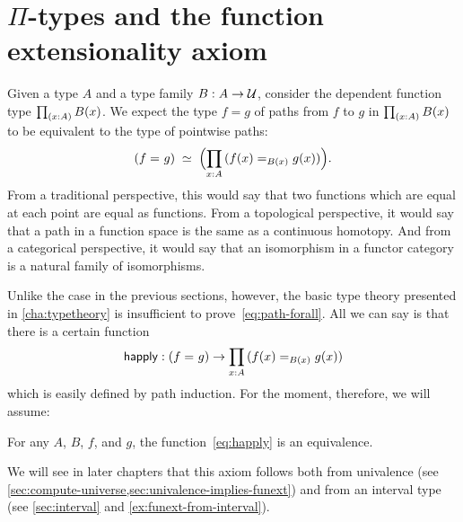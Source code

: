%

\section{\texorpdfstring{$\Pi$}{Π}-types and the function extensionality axiom}
\label{sec:compute-pi}

%
%
%
Given a type $A$ and a type family $B : A \to \mathcal{U}$, consider the dependent function type $\prd{x:A}B(x)$.
We expect the type $f=g$ of paths from $f$ to $g$ in $\prd{x:A} B(x)$ to be equivalent to
the type of pointwise paths:
\begin{equation}
  \eqvspaced{(\id{f}{g})}{\Parens{\prd{x:A} (\id[B(x)]{f(x)}{g(x)})}}.\label{eq:path-forall}
\end{equation}
From a traditional perspective, this would say that two functions which are equal at each point are equal as functions.
%
From a topological perspective, it would say that a path in a function space is the same as a continuous homotopy.
%
And from a categorical perspective, it would say that an isomorphism in a functor category is a natural family of isomorphisms.

Unlike the case in the previous sections, however, the basic type theory presented in \cref{cha:typetheory} is insufficient to prove~\eqref{eq:path-forall}.
All we can say is that there is a certain function
\begin{equation}\label{eq:happly}
  \happly : (\id{f}{g}) \to \prd{x:A} (\id[B(x)]{f(x)}{g(x)})
\end{equation}
which is easily defined by path induction.
For the moment, therefore, we will assume:

\begin{axiom}\label{axiom:funext}
  For any $A$, $B$, $f$, and $g$, the function~\eqref{eq:happly} is an equivalence.
\end{axiom}

We will see in later chapters that this axiom follows both from univalence (see \cref{sec:compute-universe,sec:univalence-implies-funext}) and from an interval type (see \cref{sec:interval} and \cref{ex:funext-from-interval}).

